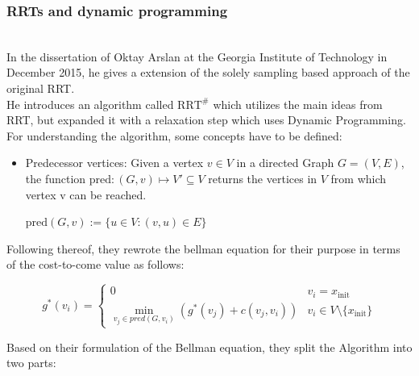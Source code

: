 \documentclass[conference]{IEEEtran}
\begin{document}
\subsubsection{RRTs and dynamic programming}
\quad \\
In the dissertation of Oktay Arslan at the Georgia Institute of Technology in December 2015, he gives a extension of the solely sampling based approach of the original RRT.\\
He introduces an algorithm called $\text{RRT}^\#$ which utilizes the main ideas from RRT, but expanded it with a relaxation step which uses Dynamic Programming.\\
For understanding the algorithm, some concepts have to be defined:
\begin{itemize}
\item Predecessor vertices: Given a vertex $v \in V$ in a directed Graph $G = (V,E)$, the function $\text{pred} : (G,v) \mapsto V' \subseteq V$ returns the vertices in $V$ from which vertex v can be reached.
\begin{center}
$\text{pred}(G,v) := \{u \in V: (v,u) \in E\}$
\end{center}
\end{itemize}
Following thereof, they rewrote the bellman equation for their purpose in terms of the cost-to-come value as follows:
\begin{small}
\begin{equation}
g^*(v_i) = 
\begin{cases}
0 & v_i = x_\text{init}\\
\min_{v_j \in pred(G,v_i)} (g^*(v_j) + c(v_j,v_i)) & v_i \in V \setminus \{x_\text{init}\}
\end{cases}
\end{equation}
\end{small}
Based on their formulation of the Bellman equation, they split the Algorithm into two parts:\\
\end{document}
